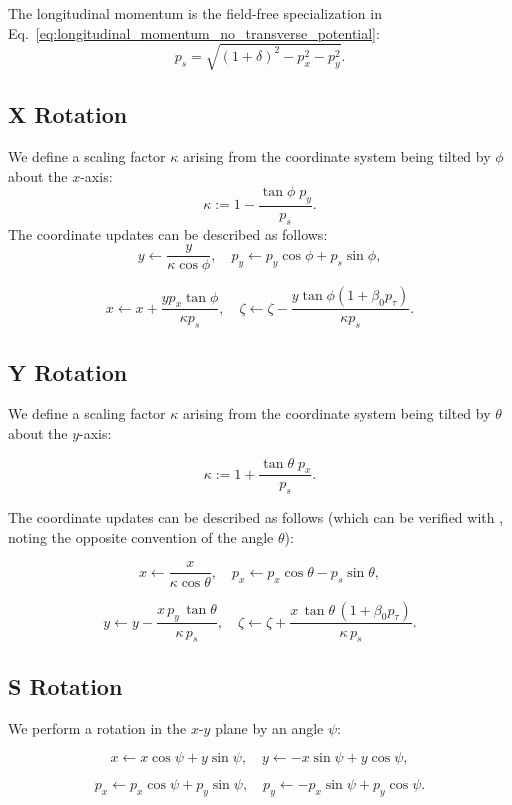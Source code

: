 The longitudinal momentum is the field-free specialization in
Eq.~\eqref{eq:longitudinal_momentum_no_transverse_potential}:
\[
	p_s = \sqrt{(1 + \delta)^2 - p_x^2 - p_y^2}.
\]

\subsection{X Rotation}

We define a scaling factor $\kappa$ arising from the coordinate system being tilted by $\phi$ about the $x$-axis:
\[
\kappa := 1 - \frac{\tan\phi \; p_y}{p_s}.
\]
The coordinate updates can be described as follows:
\[
y \leftarrow \frac{y}{\kappa \cos\phi}, \quad p_y \leftarrow p_y \cos\phi + p_s \sin\phi,
\]

\[
x \leftarrow x + \frac{y p_x \tan\phi}{\kappa p_s}, \quad \zeta \leftarrow \zeta - \frac{y \tan\phi \left(1 + \beta_0 p_\tau \right)}{\kappa p_s}.
\]

\subsection{Y Rotation}\label{sec:Yrotation}

We define a scaling factor $\kappa$ arising from the coordinate system being tilted by $\theta$ about the $y$-axis:

\[
\kappa := 1 + \frac{\tan\theta \; p_x}{p_s}.
\]

The coordinate updates can be described as follows (which can be verified with \cite{forest99}, noting the opposite convention of the angle $\theta$):

\[
x \leftarrow \frac{x}{\kappa \cos\theta},
\quad
p_x \leftarrow p_x \cos\theta - p_s \sin\theta,
\]

\[
y \leftarrow y - \frac{x\,p_y\,\tan\theta}{\kappa\,p_s},
\quad
\zeta \leftarrow \zeta + \frac{x\,\tan\theta\,(1 + \beta_0 p_\tau)}{\kappa\,p_s}.
\]

\subsection{S Rotation}

We perform a rotation in the $x$-$y$ plane by an angle $\psi$:

\[
x \leftarrow x \cos\psi + y \sin\psi,
\quad
y \leftarrow -x \sin\psi + y \cos\psi,
\]

\[
p_x \leftarrow p_x \cos\psi + p_y \sin\psi,
\quad
p_y \leftarrow -p_x \sin\psi + p_y \cos\psi.
\]


